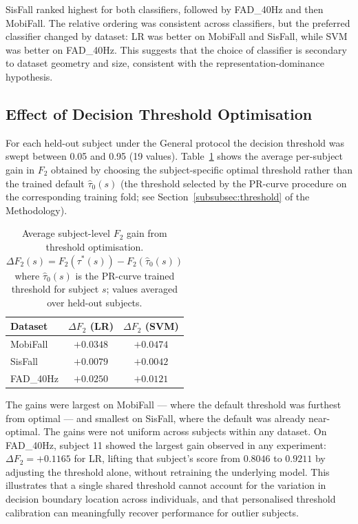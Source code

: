 SisFall ranked highest for both classifiers, followed by FAD\_40Hz and then MobiFall. The relative ordering was consistent across classifiers, but the preferred classifier changed by dataset: LR was better on MobiFall and SisFall, while SVM was better on FAD\_40Hz. This suggests that the choice of classifier is secondary to dataset geometry and size, consistent with the representation-dominance hypothesis.


\subsection{Effect of Decision Threshold Optimisation}
\label{subsubsec:threshold_effect}

For each held-out subject under the General protocol the decision threshold was swept between 0.05 and 0.95 (19 values). Table~\ref{tab:threshold_gains} shows the average per-subject gain in $F_2$ obtained by choosing the subject-specific optimal threshold rather than the trained default $\hat\tau_0(s)$ (the threshold selected by the PR-curve procedure on the corresponding training fold; see Section~\ref{subsubsec:threshold} of the Methodology).

\begin{table}[h!]
\centering
\caption{Average subject-level $F_2$ gain from threshold optimisation.
  $\Delta F_2(s) = F_2(\tau^*(s)) - F_2(\hat\tau_0(s))$ where $\hat\tau_0(s)$ is the
  PR-curve trained threshold for subject $s$; values averaged over held-out subjects.}
\label{tab:threshold_gains}
\small
\begin{tabular}{lcc}
\toprule
\textbf{Dataset} & \textbf{$\Delta F_2$ (LR)} & \textbf{$\Delta F_2$ (SVM)} \\
\midrule
MobiFall   & $+0.0348$ & $+0.0474$ \\
SisFall    & $+0.0079$ & $+0.0042$ \\
FAD\_40Hz  & $+0.0250$ & $+0.0121$ \\
\bottomrule
\end{tabular}
\end{table}

The gains were largest on MobiFall --- where the default threshold was furthest from optimal --- and smallest on SisFall, where the default was already near-optimal. The gains were not uniform across subjects within any dataset. On FAD\_40Hz, subject 11 showed the largest gain observed in any experiment: $\Delta F_2 = +0.1165$ for LR, lifting that subject's score from $0.8046$ to $0.9211$ by adjusting the threshold alone, without retraining the underlying model. This illustrates that a single shared threshold cannot account for the variation in decision boundary location across individuals, and that personalised threshold calibration can meaningfully recover performance for outlier subjects.

